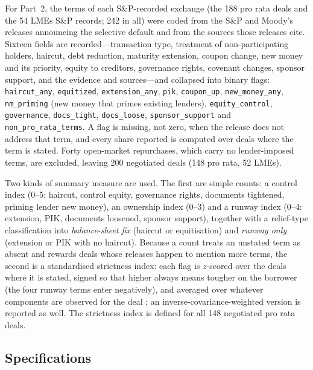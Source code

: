 \documentclass[12pt]{article}
\begin{document}
For Part~2, the terms of each S\&P-recorded exchange (the 188 pro rata deals and the 54 LMEs S\&P records; 242 in all) were coded from the S\&P and Moody's releases announcing the selective default and from the sources those releases cite. Sixteen fields are recorded---transaction type, treatment of non-participating holders, haircut, debt reduction, maturity extension, coupon change, new money and its priority, equity to creditors, governance rights, covenant changes, sponsor support, and the evidence and sources---and collapsed into binary flags: \texttt{haircut\_any}, \texttt{equitized}, \texttt{extension\_any}, \texttt{pik}, \texttt{coupon\_up}, \texttt{new\_money\_any}, \texttt{nm\_priming} (new money that primes existing lenders), \texttt{equity\_control}, \texttt{governance}, \texttt{docs\_tight}, \texttt{docs\_loose}, \texttt{sponsor\_support} and \texttt{non\_pro\_rata\_terms}. A flag is missing, not zero, when the release does not address that term, and every share reported is computed over deals where the term is stated. Forty open-market repurchases, which carry no lender-imposed terms, are excluded, leaving 200 negotiated deals (148 pro rata, 52 LMEs).

Two kinds of summary measure are used. The first are simple counts: a control index (0--5: haircut, control equity, governance rights, documents tightened, priming lender new money), an ownership index (0--3) and a runway index (0--4: extension, PIK, documents loosened, sponsor support), together with a relief-type classification into \emph{balance-sheet fix} (haircut or equitisation) and \emph{runway only} (extension or PIK with no haircut). Because a count treats an unstated term as absent and rewards deals whose releases happen to mention more terms, the second is a standardised strictness index: each flag is $z$-scored over the deals where it is stated, signed so that higher always means tougher on the borrower (the four runway terms enter negatively), and averaged over whatever components are observed for the deal \citep{kling2007}; an inverse-covariance-weighted version \citep{anderson2008} is reported as well. The strictness index is defined for all 148 negotiated pro rata deals.

\subsection{Specifications}
\end{document}
